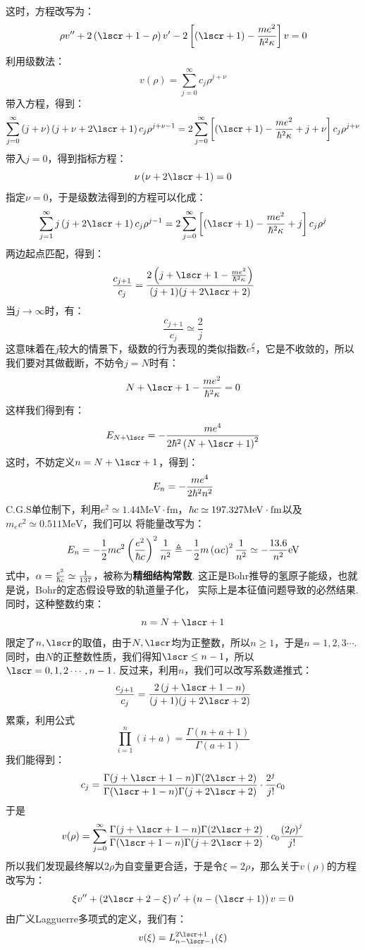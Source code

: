 这时，方程改写为：
\[
\rho v'' + 2\br{\lscr+1-\rho}v' - 2\mbr{\br{\lscr+1}-\frac{me^{2}}{\hh^2\kappa}}v = 0
\]
利用级数法：
\[
v(\rho) = \sum_{j=0}^{\infty}c_{j}\rho^{j+\nu}
\]
带入方程，得到：
\[
\sum_{j=0}^{\infty}\br{j+\nu}\br{j+\nu+2\lscr+1}c_{j}\rho^{j+\nu-1} = 2\sum_{j=0}^{\infty}\mbr{\br{\lscr+1} - \frac{me^2}{\hh^2\kappa}+j+\nu}c_{j}\rho^{j+\nu}
\]
带入\(j=0\)，得到指标方程：
\[
\nu\br{\nu+2\lscr+1} = 0
\]
指定\(\nu=0\)，于是级数法得到的方程可以化成：
\[
\sum_{j=1}^{\infty}j\br{j+2\lscr+1}c_{j}\rho^{j-1} = 2\sum_{j=0}^{\infty}\mbr{\br{\lscr+1} - \frac{me^2}{\hh^2\kappa}+j}c_{j}\rho^{j}
\]
两边起点匹配，得到：
\[
\frac{c_{j+1}}{c_{j}} = \frac{2\br{j+\lscr+1-\frac{me^2}{\hh^2\kappa}}}{(j+1)(j+2\lscr+2)}
\]
当\(j\to\infty\)时，有：
\[
\frac{c_{j+1}}{c_{j}} \simeq \frac{2}{j}
\]
这意味着在\(j\)较大的情景下，级数的行为表现的类似指数\(e^{\frac{\rho}{2}}\)，它是不收敛的，所以我们要对其做截断，不妨令\(j=N\)时有：
\[
N + \lscr + 1 - \frac{me^2}{\hh^2\kappa} = 0
\]
这样我们得到有：
\[
E_{N+\lscr} = -\frac{me^{4}}{2\hh^2\br{N+\lscr+1}^2}
\]
这时，不妨定义\(n=N+\lscr+1\)，得到：
\[
E_{n} = -\frac{me^4}{2\hbar^2n^{2}} 
\]
C.G.S单位制下，利用\(e^{2}\simeq 1.44\mathrm{MeV\cdot fm}\)，\(\hbar c\simeq 197.327\mathrm{MeV\cdot fm}\)以及\(m_{e}c^{2}\simeq 0.511\mathrm{MeV}\)，我们可以
将能量改写为：
\[
E_{n} = -\frac{1}{2}mc^{2}\left({\frac{e^{2}}{\hbar c}}\right)^{2}\frac{1}{n^{2}}\triangleq -\frac{1}{2}m\left({\alpha c}\right)^{2}\frac{1}{n^{2}}\simeq -\frac{13.6}{n^{2}}\mathrm{eV}
\]
式中，\(\alpha=\frac{e^{2}}{\hbar c}\simeq\frac{1}{137}\)，被称为\textbf{精细结构常数}. 这正是Bohr推导的氢原子能级，也就是说，Bohr的定态假设导致的轨道量子化，
实际上是本征值问题导致的必然结果. 同时，这种整数约束：
\[
n = N + \lscr + 1
\]
限定了\(n,\lscr\)的取值，由于\(N,\lscr\)均为正整数，所以\(n\geq 1\)，于是\(n=1,2,3\cdots\). 同时，由\(N\)的正整数性质，我们得知\(\lscr\leq n-1\)，所以\(\lscr=0,1,2\cdots,n-1\). 
反过来，利用\(n\)，我们可以改写系数递推式：
\[
\frac{c_{j+1}}{c_{j}} = \frac{2\br{j+\lscr+1-n}}{(j+1)(j+2\lscr+2)}
\]
累乘，利用公式
\[
\prod_{i=1}^{n}(i+a) = \frac{\Gamma(n+a+1)}{\Gamma(a+1)}
\]
我们能得到：
\[
c_{j} = \frac{\Gamma(j+\lscr+1-n)\Gamma(2\lscr+2)}{\Gamma(\lscr+1-n)\Gamma(j+2\lscr+2)}\cdot\frac{2^{j}}{j!}c_{0}
\]
于是
\[
v(\rho) = \sum_{j=0}^{\infty}\frac{\Gamma(j+\lscr+1-n)\Gamma(2\lscr+2)}{\Gamma(\lscr+1-n)\Gamma(j+2\lscr+2)}\cdot c_{0}\frac{\br{2\rho}^{j}}{j!}
\]
所以我们发现最终解以\(2\rho\)为自变量更合适，于是令\(\xi=2\rho\)，那么关于\(v(\rho)\)的方程改写为：
\[
\xi v'' + \br{2\lscr+2-\xi}v' + \br{n-\br{\lscr+1}}v = 0
\]
由广义Lagguerre多项式的定义，我们有：
\[
v(\xi) = L^{2\lscr+1}_{n-\lscr-1}(\xi)
\]
